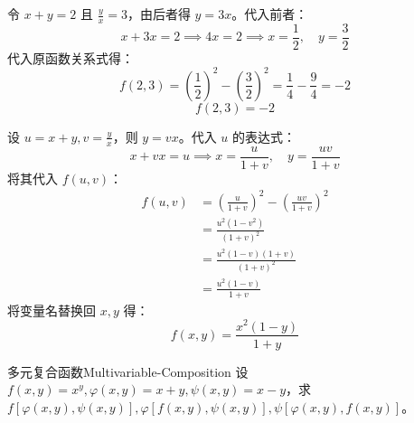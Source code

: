 \begin{solution}
    令 $x + y = 2$ 且 $\frac{y}{x} = 3$，由后者得 $y = 3x$。代入前者：
    \begin{equation*}
        x + 3x = 2 \implies 4x = 2 \implies x = \frac{1}{2}, \quad y = \frac{3}{2}
    \end{equation*}
    代入原函数关系式得：
    \begin{equation*}
        f(2, 3) = \left( \frac{1}{2} \right)^2 - \left( \frac{3}{2} \right)^2 = \frac{1}{4} - \frac{9}{4} = -2
    \end{equation*}
    \begin{equation*}
        \boxed{f(2, 3) = -2}
    \end{equation*}

    设 $u = x + y, v = \frac{y}{x}$，则 $y = vx$。代入 $u$ 的表达式：
    \begin{equation*}
        x + vx = u \implies x = \frac{u}{1+v}, \quad y = \frac{uv}{1+v}
    \end{equation*}
    将其代入 $f(u, v)$：
    \begin{equation*}
        \begin{aligned}
            f(u, v) & = \left( \frac{u}{1+v} \right)^2 - \left( \frac{uv}{1+v} \right)^2 \\
                    & = \frac{u^2(1 - v^2)}{(1+v)^2}                                     \\
                    & = \frac{u^2(1-v)(1+v)}{(1+v)^2}                                    \\
                    & = \frac{u^2(1-v)}{1+v}
        \end{aligned}
    \end{equation*}
    将变量名替换回 $x, y$ 得：
    \begin{equation*}
        \boxed{f(x, y) = \frac{x^2(1-y)}{1+y}}
    \end{equation*}
\end{solution}

\begin{problem}{多元复合函数}{Multivariable-Composition}
    设 $f(x, y) = x^y, \varphi(x, y) = x + y, \psi(x, y) = x - y$，求 $f[\varphi(x, y), \psi(x, y)], \varphi[f(x, y), \psi(x, y)], \psi[\varphi(x, y), f(x, y)]$。
\end{problem}

